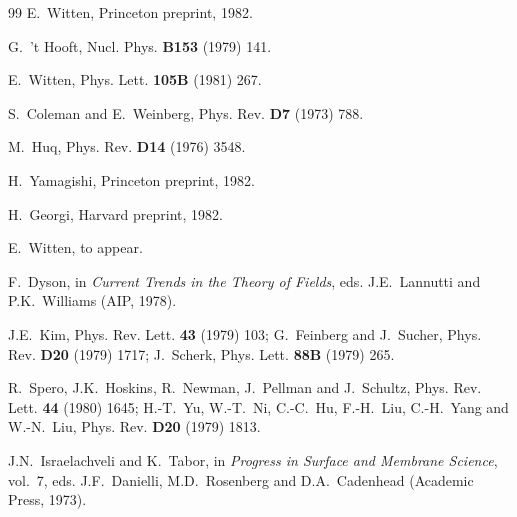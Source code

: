 \documentclass[11pt,a4paper]{article}
\begin{document}
\begin{thebibliography}{99}
E.~Witten,
Princeton preprint, 1982.

G.~'t Hooft,
Nucl. Phys. {\bf B153} (1979) 141.

E.~Witten,
Phys. Lett. {\bf 105B} (1981) 267.

S.~Coleman and E.~Weinberg,
Phys. Rev. {\bf D7} (1973) 788.

M.~Huq,
Phys. Rev. {\bf D14} (1976) 3548.

H.~Yamagishi,
Princeton preprint, 1982.

H.~Georgi,
Harvard preprint, 1982.

E.~Witten,
to appear.

F.~Dyson,
in {\it Current Trends in the Theory of Fields},
eds. J.E.~Lannutti and P.K.~Williams
(AIP, 1978).

J.E.~Kim,
Phys. Rev. Lett. {\bf 43} (1979) 103;
G.~Feinberg and J.~Sucher,
Phys. Rev. {\bf D20} (1979) 1717;
J.~Scherk,
Phys. Lett. {\bf 88B} (1979) 265.

R.~Spero, J.K.~Hoskins, R.~Newman, J.~Pellman and J.~Schultz,
Phys. Rev. Lett. {\bf 44} (1980) 1645;
H.-T.~Yu, W.-T.~Ni, C.-C.~Hu, F.-H.~Liu, C.-H.~Yang and W.-N.~Liu,
Phys. Rev. {\bf D20} (1979) 1813.

J.N.~Israelachveli and K.~Tabor,
in {\it Progress in Surface and Membrane Science}, vol.~7,
eds. J.F.~Danielli, M.D.~Rosenberg and D.A.~Cadenhead
(Academic Press, 1973).

\end{thebibliography}
\end{document}
